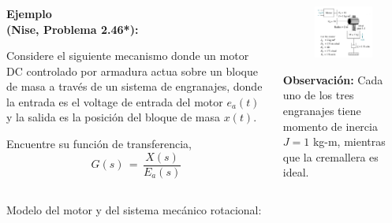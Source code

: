 \documentclass[ 10pt, xcolor = dvipsnames]{beamer}
\begin{document}
\begin{frame}[allowframebreaks]
\frametitle{\insertsection}

\begin{columns}

\begin{column}{0.45\textwidth}
\textbf{Ejemplo \\ (Nise, Problema 2.46*):}
\halfskip

Considere el siguiente mecanismo donde un motor DC controlado por armadura actua sobre un bloque de masa a trav\'es de un sistema de engranajes, donde la entrada es el voltage de entrada del motor $e_a(t)$ y la salida es la posici\'on del bloque de masa $x(t)$. 
\halfskip

Encuentre su funci\'on de transferencia, \iec
\[
G(s) \, = \, \frac{X(s)}{E_a(s)}
\]

\end{column}

\begin{column}{0.45\textwidth}
\begin{figure}[htb]
\centering
\includegraphics[width=\columnwidth]{nise_prob-2-46.jpeg}
\end{figure}
\fullskip
{
\scriptsize
\textbf{Observaci\'on:} Cada uno de los tres engranajes tiene momento de inercia $J = 1$ kg-m, mientras que la cremallera es ideal. 
}

\end{column}

\end{columns}
\framebreak

Modelo del motor y del sistema mec\'anico rotacional: 
\begin{figure}[htb]
\centering
\def\svgwidth{0.9\columnwidth}

\end{figure}

\end{frame}
\end{document}
